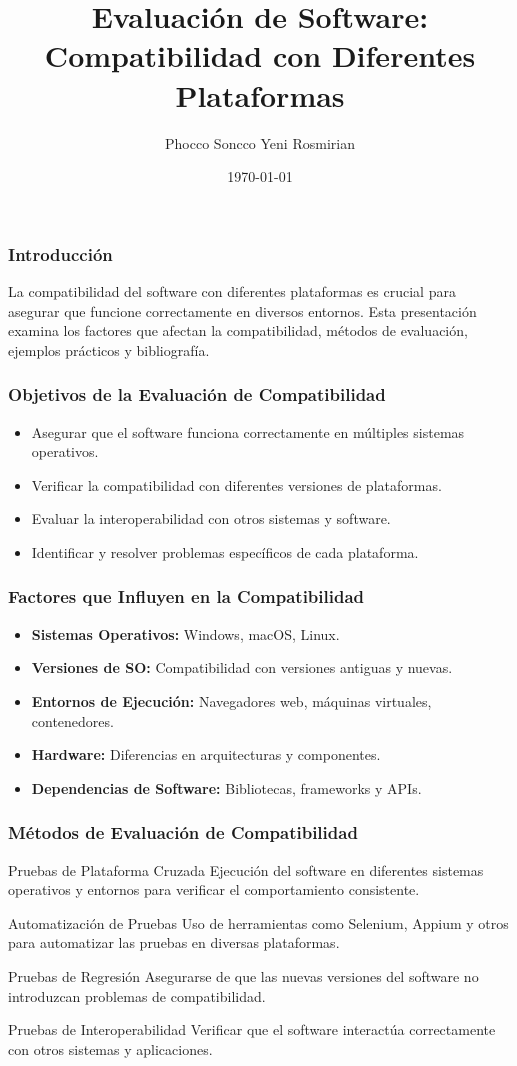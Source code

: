 \documentclass{beamer}
\title{Evaluación de Software: Compatibilidad con Diferentes Plataformas}
\author{Phocco Soncco Yeni Rosmirian}
\date{\today}
\begin{document}
\frame{\titlepage}

\begin{frame}
\frametitle{Introducción}
La compatibilidad del software con diferentes plataformas es crucial para asegurar que funcione correctamente en diversos entornos. Esta presentación examina los factores que afectan la compatibilidad, métodos de evaluación, ejemplos prácticos y bibliografía.
\end{frame}

\begin{frame}
\frametitle{Objetivos de la Evaluación de Compatibilidad}
\begin{itemize}
    \item Asegurar que el software funciona correctamente en múltiples sistemas operativos.
    \item Verificar la compatibilidad con diferentes versiones de plataformas.
    \item Evaluar la interoperabilidad con otros sistemas y software.
    \item Identificar y resolver problemas específicos de cada plataforma.
\end{itemize}
\end{frame}

\begin{frame}
\frametitle{Factores que Influyen en la Compatibilidad}
\begin{itemize}
    \item \textbf{Sistemas Operativos:} Windows, macOS, Linux.
    \item \textbf{Versiones de SO:} Compatibilidad con versiones antiguas y nuevas.
    \item \textbf{Entornos de Ejecución:} Navegadores web, máquinas virtuales, contenedores.
    \item \textbf{Hardware:} Diferencias en arquitecturas y componentes.
    \item \textbf{Dependencias de Software:} Bibliotecas, frameworks y APIs.
\end{itemize}
\end{frame}

\begin{frame}
\frametitle{Métodos de Evaluación de Compatibilidad}
\begin{block}{Pruebas de Plataforma Cruzada}
Ejecución del software en diferentes sistemas operativos y entornos para verificar el comportamiento consistente.
\end{block}
\begin{block}{Automatización de Pruebas}
Uso de herramientas como Selenium, Appium y otros para automatizar las pruebas en diversas plataformas.
\end{block}
\begin{block}{Pruebas de Regresión}
Asegurarse de que las nuevas versiones del software no introduzcan problemas de compatibilidad.
\end{block}
\begin{block}{Pruebas de Interoperabilidad}
Verificar que el software interactúa correctamente con otros sistemas y aplicaciones.
\end{block}
\end{frame}
\end{document}
